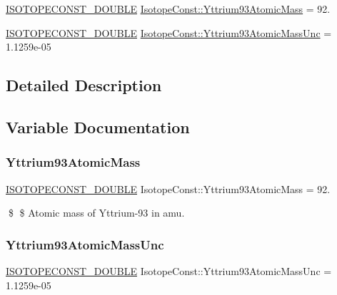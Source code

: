 \begin{DoxyCompactItemize}
\item 
\mbox{\hyperlink{group___isotope_const-_macros_ga8f45a7272ce02c0b4c65c44636ed719a}{I\+S\+O\+T\+O\+P\+E\+C\+O\+N\+S\+T\+\_\+\+D\+O\+U\+B\+LE}} \mbox{\hyperlink{group___isotope_const-_yttrium-_y93_ga8ccf52119ec5029816212e151d1ae41e}{Isotope\+Const\+::\+Yttrium93\+Atomic\+Mass}} = 92.
\item 
\mbox{\hyperlink{group___isotope_const-_macros_ga8f45a7272ce02c0b4c65c44636ed719a}{I\+S\+O\+T\+O\+P\+E\+C\+O\+N\+S\+T\+\_\+\+D\+O\+U\+B\+LE}} \mbox{\hyperlink{group___isotope_const-_yttrium-_y93_ga779c3cbcaf1830cb785d7843e6033988}{Isotope\+Const\+::\+Yttrium93\+Atomic\+Mass\+Unc}} = 1.\+1259e-\/05
\end{DoxyCompactItemize}


\subsection{Detailed Description}


\subsection{Variable Documentation}
\mbox{\label{group___isotope_const-_yttrium-_y93_ga8ccf52119ec5029816212e151d1ae41e}} 
\subsubsection{\texorpdfstring{Yttrium93\+Atomic\+Mass}{Yttrium93AtomicMass}}
{\footnotesize\ttfamily \mbox{\hyperlink{group___isotope_const-_macros_ga8f45a7272ce02c0b4c65c44636ed719a}{I\+S\+O\+T\+O\+P\+E\+C\+O\+N\+S\+T\+\_\+\+D\+O\+U\+B\+LE}} Isotope\+Const\+::\+Yttrium93\+Atomic\+Mass = 92.}

\$ \$ Atomic mass of Yttrium-\/93 in amu. \mbox{\label{group___isotope_const-_yttrium-_y93_ga779c3cbcaf1830cb785d7843e6033988}} 
\subsubsection{\texorpdfstring{Yttrium93\+Atomic\+Mass\+Unc}{Yttrium93AtomicMassUnc}}
{\footnotesize\ttfamily \mbox{\hyperlink{group___isotope_const-_macros_ga8f45a7272ce02c0b4c65c44636ed719a}{I\+S\+O\+T\+O\+P\+E\+C\+O\+N\+S\+T\+\_\+\+D\+O\+U\+B\+LE}} Isotope\+Const\+::\+Yttrium93\+Atomic\+Mass\+Unc = 1.\+1259e-\/05}

